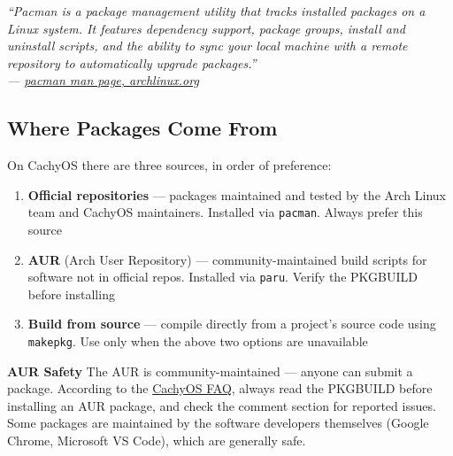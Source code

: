 \documentclass{article}
\newcommand{\code}[1]{\colorbox{codebg}{\texttt{#1}}}
\begin{document}
\begin{mdframed}[linewidth=1.5pt, linecolor=black!50, topline=true, bottomline=true,
	leftline=false, rightline=false, backgroundcolor=black!3]
	\small\itshape
	``Pacman is a package management utility that tracks installed packages on a
	Linux system. It features dependency support, package groups, install and
	uninstall scripts, and the ability to sync your local machine with a remote
	repository to automatically upgrade packages.''\\[4pt]
	\normalfont\small ---
	\href{https://archlinux.org/pacman/pacman.8.html}{pacman man page, archlinux.org}
\end{mdframed}

\subsection{Where Packages Come From}

On CachyOS there are three sources, in order of preference:

\begin{enumerate}[leftmargin=1.5em, label={\arabic*.}, nosep]
	\item \textbf{Official repositories} --- packages maintained and tested by the
	Arch Linux team and CachyOS maintainers. Installed via \code{pacman}. Always
	prefer this source
	\item \textbf{AUR} (Arch User Repository) --- community-maintained build scripts
	for software not in official repos. Installed via \code{paru}. Verify the
	PKGBUILD before installing
	\item \textbf{Build from source} --- compile directly from a project's source code
	using \code{makepkg}. Use only when the above two options are unavailable
\end{enumerate}

\begin{callout}{\textbf{AUR Safety}}
	The AUR is community-maintained --- anyone can submit a package. According to the
	\href{https://wiki.cachyos.org/cachyos_basic/faq/}{CachyOS FAQ}, always read the
	PKGBUILD before installing an AUR package, and check the comment section for
	reported issues. Some packages are maintained by the software developers themselves
	(Google Chrome, Microsoft VS Code), which are generally safe.
\end{callout}
\end{document}
